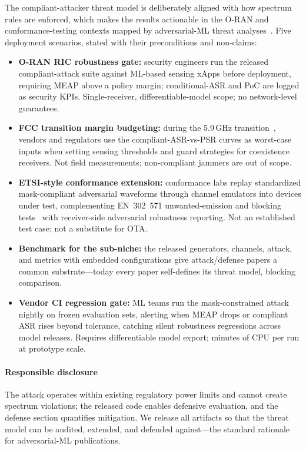 \documentclass[review]{elsarticle}
\begin{document}
The compliant-attacker threat model is deliberately aligned with how
spectrum rules are enforced, which makes the results actionable in the
O-RAN and conformance-testing contexts mapped by adversarial-ML threat
analyses~\cite{habler2025}. Five deployment scenarios, stated with their
preconditions and non-claims:

\begin{itemize}
\item \textbf{O-RAN RIC robustness gate:} security engineers run the
released compliant-attack suite against ML-based sensing xApps before
deployment, requiring MEAP above a policy margin; conditional-ASR and PoC
are logged as security KPIs. Single-receiver, differentiable-model scope; no
network-level guarantees.
\item \textbf{FCC transition margin budgeting:} during the 5.9\,GHz
transition~\cite{fcc2020,fcc2024}, vendors and regulators use the
compliant-ASR-vs-PSR curves as worst-case inputs when setting sensing
thresholds and guard strategies for coexistence receivers. Not field
measurements; non-compliant jammers are out of scope.
\item \textbf{ETSI-style conformance extension:} conformance labs replay
standardized mask-compliant adversarial waveforms through channel emulators
into devices under test, complementing EN~302~571 unwanted-emission and
blocking tests~\cite{etsi302571} with receiver-side adversarial robustness
reporting. Not an established test case; not a substitute for OTA.
\item \textbf{Benchmark for the sub-niche:} the released generators,
channels, attack, and metrics with embedded configurations give
attack/defense papers a common substrate---today every paper self-defines
its threat model, blocking comparison.
\item \textbf{Vendor CI regression gate:} ML teams run the mask-constrained
attack nightly on frozen evaluation sets, alerting when MEAP drops or
compliant ASR rises beyond tolerance, catching silent robustness
regressions across model releases. Requires differentiable model export;
minutes of CPU per run at prototype scale.
\end{itemize}

\paragraph{Responsible disclosure} The attack operates within existing
regulatory power limits and cannot create spectrum violations; the released
code enables defensive evaluation, and the defense section quantifies
mitigation. We release all artifacts so that the threat model can be
audited, extended, and defended against---the standard rationale for
adversarial-ML publications.
\end{document}
